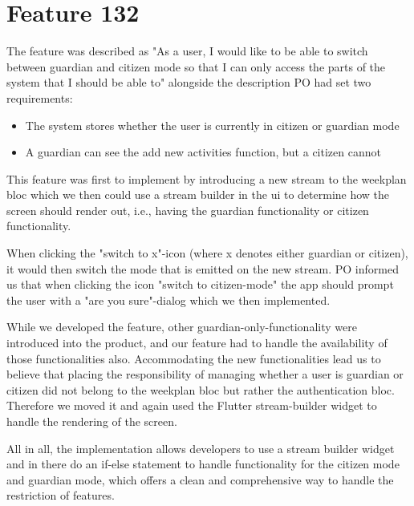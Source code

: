 \section{Feature 132}
The feature was described as "As a user, I would like to be able to switch between guardian and citizen mode so that I can only access the parts of the system that I should be able to" alongside the description \gls{PO} had set two requirements:

\begin{itemize}
  \item The system stores whether the user is currently in citizen or guardian mode
  \item A guardian can see the add new activities function, but a citizen cannot
\end{itemize}

This feature was first to implement by introducing a new stream to the weekplan \gls{bloc} which we then could use a stream builder in the \gls{ui} to determine how the screen should render out, i.e., having the guardian functionality or citizen functionality.

When clicking the "switch to x"-icon (where x denotes either guardian or citizen), it would then switch the mode that is emitted on the new stream. \gls{PO} informed us that when clicking the icon "switch to citizen-mode" the app should prompt the user with a "are you sure"-dialog which we then implemented.

While we developed the feature, other guardian-only-functionality were introduced into the product, and our feature had to handle the availability of those functionalities also. Accommodating the new functionalities lead us to believe that placing the responsibility of managing whether a user is guardian or citizen did not belong to the weekplan \gls{bloc} but rather the authentication \gls{bloc}. Therefore we moved it and again used the Flutter stream-builder widget to handle the rendering of the screen.

All in all, the implementation allows developers to use a stream builder widget and in there do an if-else statement to handle functionality for the citizen mode and guardian mode, which offers a clean and comprehensive way to handle the restriction of features.